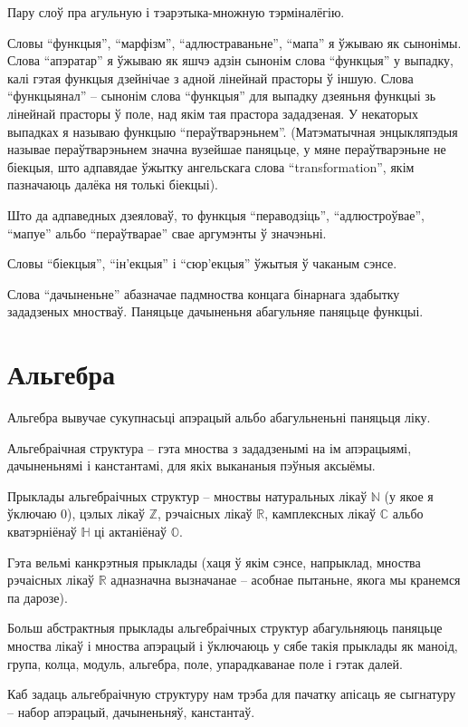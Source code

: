 \documentclass[a4paper,12pt]{book}
\begin{document}
Пару слоў пра агульную і тэарэтыка-множную тэрміналёгію.

Словы ``функцыя'', ``марфізм'', ``адлюстраваньне'', ``мапа'' я ўжываю
як сынонімы. Слова ``апэратар'' я ўжываю як яшчэ адзін сынонім слова
``функцыя'' у выпадку, калі гэтая функцыя дзейнічае з адной лінейнай
прасторы ў іншую. Слова ``функцыянал'' -- сынонім слова ``функцыя''
для выпадку дзеяньня функцыі зь лінейнай прасторы ў поле, над якім тая
прастора зададзеная. У некаторых выпадках я называю функцыю
``пераўтварэньнем''. (Матэматычная энцыкляпэдыя называе
пераўтварэньнем значна вузейшае паняцьце, у мяне пераўтварэньне не
біекцыя, што адпавядае ўжытку ангельскага слова ``transformation'',
якім пазначаюць далёка ня толькі біекцыі).

Што да адпаведных дзеяловаў, то функцыя ``пераводзіць'',
``адлюстроўвае'', ``мапуе'' альбо ``пераўтварае'' свае аргумэнты ў
значэньні.

Словы ``біекцыя'', ``ін'екцыя'' і ``сюр'екцыя'' ўжытыя ў чаканым
сэнсе.

Слова ``дачыненьне'' абазначае падмноства концага бінарнага здабытку
зададзеных мностваў. Паняцьце дачыненьня абагульняе паняцьце функцыі.

\section{Альгебра}

Альгебра вывучае сукупнасьці апэрацый альбо абагульненьні паняцьця
ліку.

Альгебраічная структура -- гэта мноства з зададзенымі на ім
апэрацыямі, дачыненьнямі
і канстантамі, для якіх выкананыя пэўныя аксыёмы.

Прыклады альгебраічных структур -- мноствы натуральных лікаў
$\mathbb{N}$ (у якое я ўключаю $0$), цэлых лікаў $\mathbb{Z}$,
рэчаісных лікаў $\mathbb{R}$, камплексных лікаў $\mathbb{C}$ альбо
кватэрніёнаў $\mathbb{H}$ ці актаніёнаў $\mathbb{O}$.

Гэта вельмі канкрэтныя прыклады (хаця ў якім сэнсе, напрыклад, мноства
рэчаісных лікаў $\mathbb{R}$ адназначна вызначанае -- асобнае
пытаньне, якога мы кранемся па дарозе).

Больш абстрактныя прыклады альгебраічных структур абагульняюць
паняцьце мноства лікаў і мноства апэрацый і ўключаюць у сябе такія
прыклады як маноід, група, колца, модуль, альгебра, поле,
упарадкаванае поле і гэтак далей.

Каб задаць альгебраічную структуру нам трэба для пачатку апісаць яе
сыгнатуру --
набор апэрацый, дачыненьняў, канстантаў.
\end{document}
